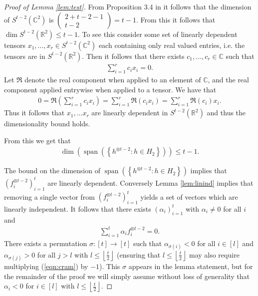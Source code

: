 \documentclass[aos,preprint]{imsart}
\def\rn{\mathbb{R}}
\def\cn{\mathbb{C}}
\def\l{\left}
\def\r{\right}
\def\spn{\operatorname{span}}
\theoremstyle{plain}
\theoremstyle{defintion}
\begin{document}
\begin{proof}[Proof of Lemma \ref{lem:test}]
	From Proposition 3.4 in \cite{symtensorrank} it follows that the dimension of $S^{ t-2 }\left( \cn^2 \right)$ is $\left( \begin{array}{c} 2+ t-2-1 \\ t-2 \end{array} \right) = t-1$. From this it follows that $\dim S^{t-2}\left( \rn^2 \right) \le t-1$. To see this consider some set of linearly dependent tensors $x_1,\ldots,x_r  \in S^{t-2}\left( \mathbb{C}^2 \right)$ each containing only real valued entries, i.e. the tensors are in $S^{t-2}\l(\rn^2\r)$. Then it follows that there exists $c_1,\ldots, c_r \in \mathbb{C}$ such that
		\begin{eqnarray*}
			\sum_{i=1}^r c_i x_i = 0.
		\end{eqnarray*}
		Let $\Re$ denote the real component when applied to an element of $\mathbb{C}$, and the real component applied entrywise when applied to a tensor. We have that
		\begin{align*}
			0 =\Re\left(\sum_{i=1}^r  c_i  x_i\right) = \sum_{i=1}^r \Re \left(c_i  x_i\right) = \sum_{i=1}^r \Re \left(c_i  \right) x_i.
		\end{align*}
		Thus it follows that $x_1,\ldots x_r$ are linearly dependent in $S^{t-2}\l(\rn^2\r)$ and thus the dimensionality bound holds.


		From this we get that 
		\begin{align*}
			\dim\left( \spn\left( \left\{ h^{\otimes t-2}: h \in H_2 \right\} \right)\right)\le t-1.
		\end{align*}

		The bound on the dimension of $\spn\left( \left\{ h^{\otimes t-2}: h \in H_2 \right\} \right)$ implies that $\left( f_i^{\otimes t-2} \right)_{i=1}^{t}$ are linearly dependent. Conversely Lemma \ref{lem:linind} implies that removing a single vector from $\left( f_i^{\otimes t-2} \right)_{i=1}^{t}$ yields a set of vectors which are linearly independent. It follows that there exists $\left( \alpha_i \right)_{i=1}^{t}$ with $\alpha_i \neq 0$ for all $i$ and
		\begin{eqnarray} \label{eqn:cram}
			\sum_{i=1}^{t}\alpha_i f_i^{\otimes t-2} = 0.
		\end{eqnarray}
		There exists a permutation $\sigma:[t] \to [t]$ such that $\alpha_{\sigma\left( i \right)}< 0$ for all $i \in \left[ l \right]$ and $\alpha_{\sigma\left( j \right)} >0$ for all $j>l$ with $l\le \l\lfloor \frac{t}{2}\r\rfloor$ (ensuring that $l\le \l\lfloor \frac{t}{2}\r\rfloor$ may also require multiplying (\ref{eqn:cram}) by $-1$). This $\sigma$ appears in the lemma statement, but for the remainder of the proof we will simply assume without loss of generality that $\alpha_i<0$ for $i\in \left[ l \right]$ with $l\le \l\lfloor \frac{t}{2}\r\rfloor$.


\end{proof}
\end{document}
